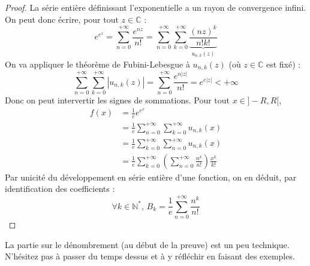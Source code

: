 \begin{proof}
		\medskip
		La série entière définissant l'exponentielle a un rayon de convergence infini. On peut donc écrire, pour tout $z \in \mathbb{C}$ :
		\[ e^{e^z} = \sum_{n=0}^{+\infty} \frac{e^{nz}}{n!} = \sum_{n=0}^{+\infty} \sum_{k=0}^{+\infty} \underbrace{\frac{(nz)^k}{n!k!}}_{u_{n,k}(z)} \]
		On va appliquer le théorème de Fubini-Lebesgue à $u_{n,k}(z)$ (où $z \in \mathbb{C}$ est fixé) :
		\[ \sum_{n=0}^{+\infty} \sum_{k=0}^{+\infty} |u_{n,k}(z)| = \sum_{n=0}^{+\infty} \frac{e^{n|z|}}{n!} = e^{e|z|} < +\infty \]
		Donc on peut intervertir les signes de sommations. Pour tout $x \in ]-R,R[$,
		\begin{align*}
			f(x) &= \frac{1}{e} e^{e^x} \\
			&= \frac{1}{e} \sum_{n=0}^{+\infty} \sum_{k=0}^{+\infty} u_{n,k}(x) \\
			&= \frac{1}{e} \sum_{k=0}^{+\infty} \sum_{n=0}^{+\infty} u_{n,k}(x) \\
			&= \frac{1}{e} \sum_{k=0}^{+\infty} \left( \sum_{n=0}^{+\infty} \frac{n^k}{n!} \right) \frac{x^k}{k!}
		\end{align*}
		Par unicité du développement en série entière d'une fonction, on en déduit, par identification des coefficients :
		\[ \forall k \in \mathbb{N}^*, \, B_k = \frac{1}{e} \sum_{n=0}^{+\infty} \frac{n^k}{n!} \]
	\end{proof}

	\begin{remark}
		La partie sur le dénombrement (au début de la preuve) est un peu technique. N'hésitez pas à passer du temps dessus et à y réfléchir en faisant des exemples.
	\end{remark}


